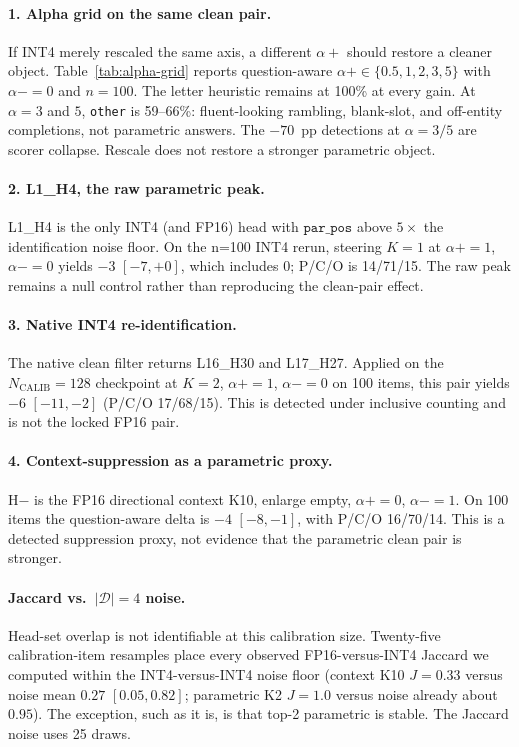 \documentclass{article} %
\begin{document}
\paragraph{1. Alpha grid on the same clean pair.}
If INT4 merely rescaled the same axis, a different $\alpha{+}$ should restore a cleaner object. Table~\ref{tab:alpha-grid} reports question-aware $\alpha{+} \in \{0.5, 1, 2, 3, 5\}$ with $\alpha{-}{=}0$ and $n{=}100$. The letter heuristic remains at 100\% at every gain. At $\alpha{=}3$ and $5$, \texttt{other} is 59--66\%: fluent-looking rambling, blank-slot, and off-entity completions, not parametric answers. The $-70$~pp detections at $\alpha{=}3/5$ are scorer collapse. Rescale does not restore a stronger parametric object.

\paragraph{2. L1\_H4, the raw parametric peak.}
L1\_H4 is the only INT4 (and FP16) head with $\texttt{par\_pos}$ above $5\times$ the identification noise floor. On the n=100 INT4 rerun, steering $K{=}1$ at $\alpha{+}{=}1$, $\alpha{-}{=}0$ yields $-3$ $[-7,+0]$, which includes 0; P/C/O is 14/71/15. The raw peak remains a null control rather than reproducing the clean-pair effect.

\paragraph{3. Native INT4 re-identification.}
The native clean filter returns L16\_H30 and L17\_H27. Applied on the $N_{\mathrm{CALIB}}{=}128$ checkpoint at $K{=}2$, $\alpha{+}{=}1$, $\alpha{-}{=}0$ on 100 items, this pair yields $-6$ $[-11,-2]$ (P/C/O 17/68/15). This is detected under inclusive counting and is not the locked FP16 pair.

\paragraph{4. Context-suppression as a parametric proxy.}
H$-$ is the FP16 directional context K10, enlarge empty, $\alpha{+}{=}0$, $\alpha{-}{=}1$. On 100 items the question-aware delta is $-4$ $[-8,-1]$, with P/C/O 16/70/14. This is a detected suppression proxy, not evidence that the parametric clean pair is stronger.

\paragraph{Jaccard vs.\ $|\mathcal{D}|{=}4$ noise.}
Head-set overlap is not identifiable at this calibration size. Twenty-five calibration-item resamples place every observed FP16-versus-INT4 Jaccard we computed within the INT4-versus-INT4 noise floor (context K10 $J{=}0.33$ versus noise mean $0.27$ $[0.05, 0.82]$; parametric K2 $J{=}1.0$ versus noise already about $0.95$). The exception, such as it is, is that top-2 parametric is stable. The Jaccard noise uses 25 draws.
\end{document}
